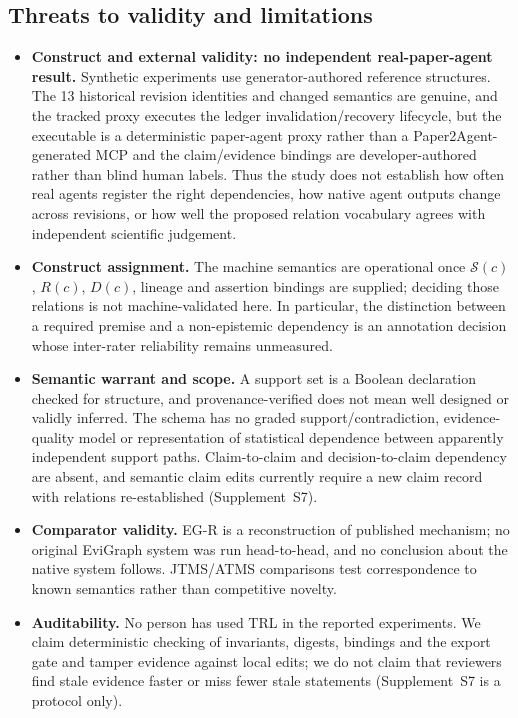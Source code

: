 \documentclass[journal]{IEEEtran}
\newcommand{\suppl}[1]{Supplement~#1}
\begin{document}
\subsection{Threats to validity and limitations}
\begin{itemize}
    \item \textbf{Construct and external validity: no independent real-paper-agent result.} Synthetic experiments use generator-authored reference structures. The 13 historical revision identities and changed semantics are genuine, and the tracked proxy executes the ledger invalidation/recovery lifecycle, but the executable is a deterministic paper-agent proxy rather than a Paper2Agent-generated MCP and the claim/evidence bindings are developer-authored rather than blind human labels. Thus the study does not establish how often real agents register the right dependencies, how native agent outputs change across revisions, or how well the proposed relation vocabulary agrees with independent scientific judgement.
    \item \textbf{Construct assignment.} The machine semantics are operational once $\mathcal{S}(c)$, $R(c)$, $D(c)$, lineage and assertion bindings are supplied; deciding those relations is not machine-validated here. In particular, the distinction between a required premise and a non-epistemic dependency is an annotation decision whose inter-rater reliability remains unmeasured.
    \item \textbf{Semantic warrant and scope.} A support set is a Boolean declaration checked for structure, and provenance-verified does not mean well designed or validly inferred. The schema has no graded support/contradiction, evidence-quality model or representation of statistical dependence between apparently independent support paths. Claim-to-claim and decision-to-claim dependency are absent, and semantic claim edits currently require a new claim record with relations re-established (\suppl{S7}).
    \item \textbf{Comparator validity.} EG-R is a reconstruction of published mechanism; no original EviGraph system was run head-to-head, and no conclusion about the native system follows. JTMS/ATMS comparisons test correspondence to known semantics rather than competitive novelty.
    \item \textbf{Auditability.} No person has used TRL in the reported experiments. We claim deterministic checking of invariants, digests, bindings and the export gate and tamper evidence against local edits; we do not claim that reviewers find stale evidence faster or miss fewer stale statements (\suppl{S7} is a protocol only).

\end{itemize}
\end{document}
